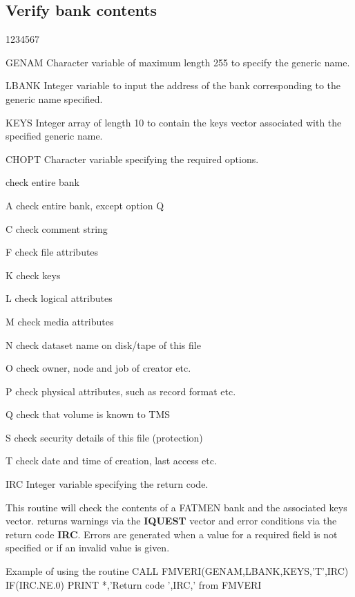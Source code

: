 \subsection{Verify bank contents}
\begin{DLtt}{1234567}
\item[GENAM]
Character variable of maximum length 255 to specify the generic name.
\item[LBANK]
Integer variable to input the address of the bank corresponding
to the generic name specified.
\item[KEYS]
Integer array of length 10 to contain the keys vector associated
with the specified generic name.
\item[CHOPT]
Character variable specifying the required options.
\begin{DLtt}{12}
\item[ ]check entire bank
\item[A]check entire bank, except option Q
\item[C]check comment string
\item[F]check file attributes
\item[K]check keys
\item[L]check logical attributes
\item[M]check media attributes
\item[N]check dataset name on disk/tape of this file
\item[O]check owner, node and job of creator etc.
\item[P]check physical attributes, such as record format etc.
\item[Q]check that volume is known to TMS
\item[S]check security details of this file (protection)
\item[T]check date and time of creation, last access etc.
\end{DLtt}
\item[IRC]
Integer variable specifying the return code.
\end{DLtt}
\par
This routine will check the contents of a FATMEN bank and the associated
keys vector.
 returns warnings via the
{\bf IQUEST} vector and error conditions
via the return code {\bf IRC}. Errors are generated when
a value for a required field is not specified or if an invalid
value is given.
\begin{XMPt}{Example of using the \protect{} routine}
      CALL FMVERI(GENAM,LBANK,KEYS,'T',IRC)
      IF(IRC.NE.0) PRINT *,'Return code ',IRC,' from FMVERI
\end{XMPt}
